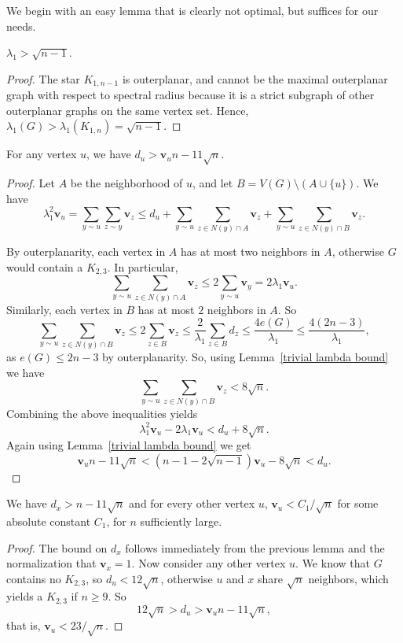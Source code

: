 We begin with an easy lemma that is clearly not optimal, but suffices for our needs.
\begin{lemma}\label{trivial lambda bound}
 $\lambda_1 > \sqrt{n-1}$.
\end{lemma}
\begin{proof}
 The star $K_{1,n-1}$ is outerplanar, and cannot be the maximal outerplanar
 graph with respect to spectral radius because it is a strict subgraph of other outerplanar graphs on the same vertex set.  Hence, $\lambda_1(G) > \lambda_1(K_{1,n}) = \sqrt{n-1}$.
\end{proof}

\begin{lemma}
 For any vertex $u$, we have $d_u > \mathbf{v}_un - 11\sqrt{n}$.
\end{lemma}
\begin{proof}
 Let $A$ be the neighborhood of $u$, and let $B = V(G) \setminus (A\cup \{u\})$.  We have 
  \[ \lambda_1^2 \mathbf{v}_u = \sum_{y \sim u} \sum_{z \sim y} \mathbf{v}_z \leq d_u + \sum_{y \sim u} \sum_{z \in N(y)\cap A} \mathbf{v}_z + \sum_{y \sim u} \sum_{z \in N(y)\cap B} \mathbf{v}_z. \]

\noindent By outerplanarity, each vertex in $A$ has at most two neighbors in $A$, otherwise
$G$ would contain a $K_{2,3}$.  In particular,
 \[ \sum_{y \sim u} \sum_{z \in N(y)\cap A} \mathbf{v}_z  \leq 2 \sum_{y \sim u} \mathbf{v}_y = 2\lambda_1 \mathbf{v}_u. \]
Similarly, each vertex in $B$ has at most $2$ neighbors in $A$.  So
 \[ \sum_{y \sim u} \sum_{z \in N(y)\cap B} \mathbf{v}_z \leq 2 \sum_{z \in B} \mathbf{v}_z \leq \frac{2}{\lambda_1} \sum_{z \in B} d_z \leq \frac{4e(G)}{\lambda_1} \leq \frac{4(2n-3)}{\lambda_1}, \]
as  $e(G) \leq 2n-3$ by outerplanarity.  So, using Lemma~\ref{trivial lambda bound} we have
 \[ \sum_{y \sim u} \sum_{z \in N(y)\cap B} \mathbf{v}_z < 8 \sqrt{n}.\]
Combining the above inequalities yields
 \[ \lambda_1^2 \mathbf{v}_u - 2\lambda_1 \mathbf{v}_u < d_u + 8 \sqrt{n}.\]
Again using Lemma~\ref{trivial lambda bound} we get
 \[ \mathbf{v}_u n - 11\sqrt{n} <  (n-1 - 2\sqrt{n-1}) \mathbf{v}_u - 8 \sqrt{n} < d_u .\]
\end{proof}

\begin{lemma}\label{small eigvec}
 We have $d_x > n - 11 \sqrt{n}$ and for every other vertex $u$, $\mathbf{v}_u < C_1 / \sqrt{n}$ for some absolute constant $C_1$, for $n$ sufficiently large.
\end{lemma}
\begin{proof}
The bound on $d_x$ follows immediately from the previous lemma and the normalization that
$\mathbf{v}_x=1$.  Now consider any other vertex $u$.  We know that $G$ contains no $K_{2,3}$, so $d_u < 12 \sqrt{n}$, otherwise $u$ and $x$ share $\sqrt{n}$ neighbors, which
yields a $K_{2,3}$ if $n \geq 9$.  So
 \[ 12 \sqrt{n} > d_u > \mathbf{v}_u n - 11\sqrt{n}, \]
that is, $\mathbf{v}_u < 23 / \sqrt{n}$.
\end{proof}

